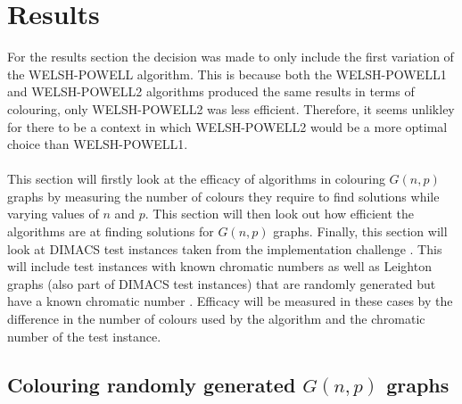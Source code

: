 \section{Results}
For the results section the decision was made to only include the first variation of the WELSH-POWELL algorithm. This is because both the WELSH-POWELL1 and WELSH-POWELL2 algorithms produced the same results in terms of colouring, only WELSH-POWELL2 was less efficient. Therefore, it seems unlikley for there to be a context in which WELSH-POWELL2 would be a more optimal choice than WELSH-POWELL1. 
\\\\
This section will firstly look at the efficacy of algorithms in colouring $G(n, p)$ graphs by measuring the number of colours they require to find solutions while varying values of $n$ and $p$. This section will then look out how efficient the algorithms are at finding solutions for $G(n, p)$ graphs. Finally, this section will look at DIMACS test instances taken from the implementation challenge \cite{DIMACSChallenge2}. This will include test instances with known chromatic numbers as well as Leighton graphs (also part of DIMACS test instances) that are randomly generated but have a known chromatic number \cite{Leighton1979AGC}. Efficacy will be measured in these cases by the difference in the number of colours used by the algorithm and the chromatic number of the test instance. 
\subsection{Colouring randomly generated  $G(n, p)$ graphs}


